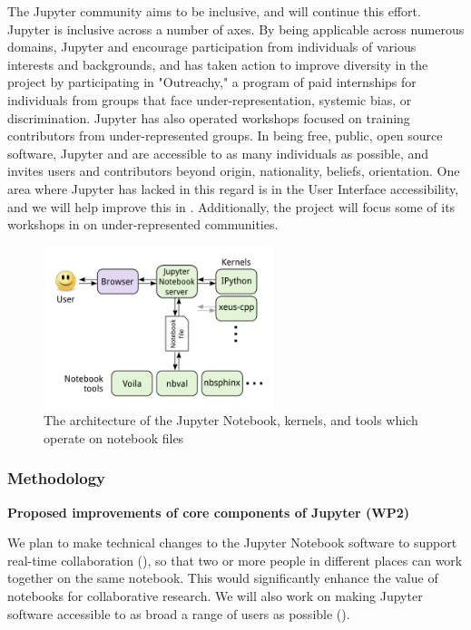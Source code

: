 The Jupyter community aims to be inclusive, and \TheProject will
continue this effort.  Jupyter is inclusive across a number of axes.
By being applicable across numerous domains, Jupyter and \TheProject
encourage participation from individuals of various interests and
backgrounds, and has taken action to improve diversity in the project
by participating in "Outreachy," a program of paid internships for
individuals from groups that face under-representation, systemic bias,
or discrimination.  Jupyter has also operated workshops focused on
training contributors from under-represented groups.  In being free,
public, open source software, Jupyter and \TheProject are accessible
to as many individuals as possible, and invites users and contributors
beyond origin, nationality, beliefs, orientation.  One area where
Jupyter has lacked in this regard is in the User Interface
accessibility, and we will help improve this in
.  Additionally, the project will
focus some of its workshops in  on
under-represented communities.


\begin{figure}[ht!]\centering
  \includegraphics[width=0.6\textwidth]{images/notebook_components.png}
  \caption{The architecture of the Jupyter Notebook, kernels, and tools
        which operate on notebook files}
  \label{fig:notebook-architecture}
\end{figure}


\subsubsection{Methodology}\label{sec:methodology}


\textbf{Proposed improvements of core components of Jupyter (WP2)}

We plan to make technical changes to the Jupyter Notebook software to support
real-time collaboration (),
so that two or more people in different places can work together
on the same notebook. This would significantly enhance the value of
notebooks for collaborative research.
We will also work on making Jupyter software accessible to as broad a
range of users as possible ().

